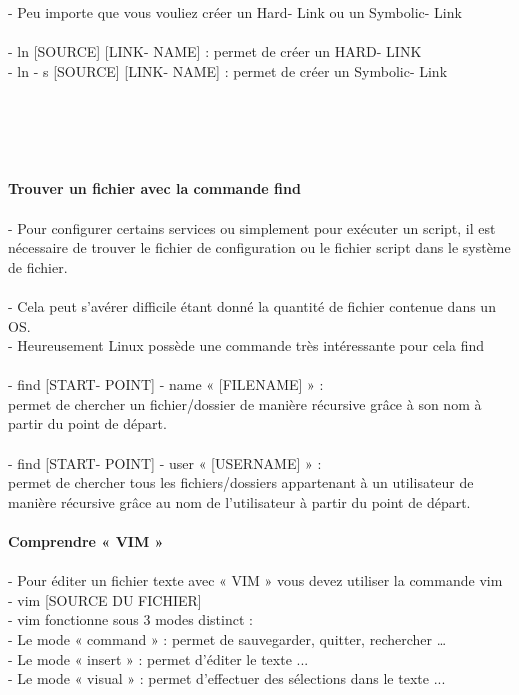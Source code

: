 \documentclass[10pt,a4paper]{article}
\begin{document}
- Peu importe que vous vouliez créer un Hard- Link ou un Symbolic- Link \\\\
- ln [SOURCE] [LINK- NAME] : permet de créer un HARD- LINK \\
- ln - s [SOURCE] [LINK- NAME] : permet de créer un Symbolic- Link\\\\\\\\\\\\
{\large\textbf{Trouver un fichier avec la commande find }}\\\\
- Pour configurer certains services ou simplement pour exécuter un script, il est nécessaire de trouver le fichier de configuration ou le fichier script dans le système de fichier. \\\\
- Cela peut s’avérer difficile étant donné la quantité de fichier contenue dans un OS. \\
- Heureusement Linux possède une commande très intéressante pour cela find \\\\
- find [START- POINT] - name « [FILENAME] » : \\permet de chercher un fichier/dossier de manière récursive grâce à son nom à partir du point de départ.\\  \\
- find [START- POINT] - user « [USERNAME] » : \\permet de chercher tous les fichiers/dossiers appartenant à un utilisateur de manière récursive grâce au nom de l’utilisateur à partir du point de départ. \\\\
{\large\textbf{Comprendre « VIM » }}\\\\
- Pour éditer un fichier texte avec « VIM » vous devez utiliser la commande vim  \\
- vim [SOURCE DU FICHIER] \\
- vim fonctionne sous 3 modes distinct : \\
- Le mode « command » : permet de sauvegarder, quitter, rechercher … \\
- Le mode « insert » : permet d’éditer le texte ... \\
- Le mode « visual » : permet d’effectuer des sélections dans le texte ... \\
\end{document}
